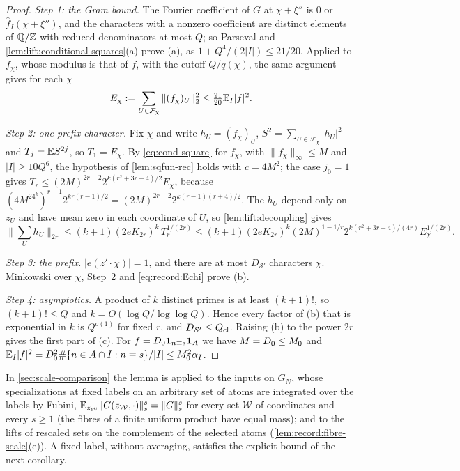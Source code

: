 \begin{proof}
\emph{Step 1: the Gram bound.} The Fourier coefficient of $G$ at $\chi+\xi''$ is
$0$ or $\widehat f_I(\chi+\xi'')$, and the characters with a nonzero coefficient
are distinct elements of $\mathbb Q/\mathbb Z$ with reduced denominators at most $Q$; so
Parseval and \cref{lem:lift:conditional-squares}(a) prove (a), as
$1+Q^4/(2|I|)\le21/20$. Applied to $f_\chi$, whose modulus is that of $f$, with
the cutoff $Q/q(\chi)$, the same argument gives for each $\chi$
\begin{equation}\label{eq:record:Echi}
 E_\chi:=\sum_{U\in\mathcal F_\chi}\|(f_\chi)_U\|_2^2\le\tfrac{21}{20}\mathbb E_I|f|^2 .
\end{equation}

\emph{Step 2: one prefix character.} Fix $\chi$ and write $h_U=(f_\chi)_U$,
$S^2=\sum_{U\in\mathcal F_\chi}|h_U|^2$ and $T_j=\mathbb E S^{2j}$, so $T_1=E_\chi$. By
\eqref{eq:cond-square} for $f_\chi$, with $\|f_\chi\|_\infty\le M$ and
$|I|\ge10Q^6$, the hypothesis of \cref{lem:sqfun-rec} holds with $c=4M^2$; the
case $j_0=1$ gives $T_r\le(2M)^{2r-2}2^{k(r^2+3r-4)/2}E_\chi$, because
$(4M^24^k)^{r-1}2^{kr(r-1)/2}=(2M)^{2r-2}2^{k(r-1)(r+4)/2}$. The $h_U$ depend only
on $z_U$ and have mean zero in each coordinate of $U$, so
\cref{lem:lift:decoupling} gives
\[
 \Big\|\sum_Uh_U\Big\|_{2r}\le(k+1)(2eK_{2r})^k\,T_r^{1/(2r)}
 \le(k+1)(2eK_{2r})^k(2M)^{1-1/r}2^{k(r^2+3r-4)/(4r)}E_\chi^{1/(2r)} .
\]

\emph{Step 3: the prefix.} $|e(z'\cdot\chi)|=1$, and there are at most
$D_{\mathcal S'}$ characters $\chi$. Minkowski over $\chi$, Step~2 and
\eqref{eq:record:Echi} prove (b).

\emph{Step 4: asymptotics.} A product of $k$ distinct primes is at least
$(k+1)!$, so $(k+1)!\le Q$ and $k=O(\log Q/\log\log Q)$. Hence every factor of
(b) that is exponential in $k$ is $Q^{o(1)}$ for fixed $r$, and
$D_{\mathcal S'}\le Q_{\rm cl}$. Raising (b) to the power $2r$ gives the first
part of (c). For $f=D_0\mathbf 1_{n\equiv s}\mathbf 1_A$ we have $M=D_0\le M_0$ and
$\mathbb E_I|f|^2=D_0^2\#\{n\in A\cap I:n\equiv s\}/|I|\le M_0^2\alpha_I$.
\end{proof}

In \cref{sec:scale-comparison} the lemma is applied to the inputs on $G_N$,
whose specializations at fixed labels on an arbitrary set of atoms are integrated over the
labels by Fubini, $\mathbb E_{z_{\mathcal W}}\|G(z_{\mathcal W},\cdot)\|_s^s=\|G\|_s^s$
for every set $\mathcal W$ of coordinates and every $s\ge1$ (the fibres of a
finite uniform product have equal mass); and to the lifts of rescaled sets on
the complement of the selected atoms (\cref{lem:record:fibre-scale}(e)). A fixed
label, without averaging, satisfies the explicit bound of the next
corollary.

